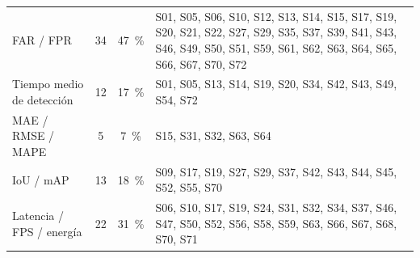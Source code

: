 \begin{xltabular}{\linewidth}{lccX}
FAR / FPR & 34 & 47~\% & S01, S05, S06, S10, S12, S13, S14, S15, S17, S19, S20, S21, S22, S27, S29, S35, S37, S39, S41, S43, S46, S49, S50, S51, S59, S61, S62, S63, S64, S65, S66, S67, S70, S72 \\
Tiempo medio de detecci\'{o}n & 12 & 17~\% & S01, S05, S13, S14, S19, S20, S34, S42, S43, S49, S54, S72 \\
MAE / RMSE / MAPE & 5 & 7~\% & S15, S31, S32, S63, S64 \\
IoU / mAP & 13 & 18~\% & S09, S17, S19, S27, S29, S37, S42, S43, S44, S45, S52, S55, S70 \\
Latencia / FPS / energ\'{i}a & 22 & 31~\% & S06, S10, S17, S19, S24, S31, S32, S34, S37, S46, S47, S50, S52, S56, S58, S59, S63, S66, S67, S68, S70, S71 \\
\end{xltabular}
\endgroup
